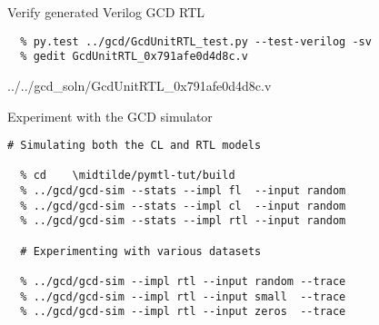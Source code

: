 \begin{task}\begin{frame}[fragile]{Verify generated Verilog GCD RTL}
\vspace{-0.25in}
\begin{Verbatim}[commandchars=\\\{\}]
  % cd    \midtilde/pymtl-tut/build
  % py.test ../gcd/GcdUnitRTL_test.py --test-verilog -sv
  % gedit GcdUnitRTL_0x791afe0d4d8c.v
\end{Verbatim}

\vspace{-0.3in}
%
{../../gcd_soln/GcdUnitRTL_0x791afe0d4d8c.v}
\end{frame}
\end{task}

\begin{task}\begin{frame}[fragile]{Experiment with the GCD simulator}
\vspace{-0.25in}
\begin{Verbatim}[commandchars=\\\{\}]
  # Simulating both the CL and RTL models

  % cd    \midtilde/pymtl-tut/build
  % ../gcd/gcd-sim --stats --impl fl  --input random
  % ../gcd/gcd-sim --stats --impl cl  --input random
  % ../gcd/gcd-sim --stats --impl rtl --input random

  # Experimenting with various datasets

  % ../gcd/gcd-sim --impl rtl --input random --trace
  % ../gcd/gcd-sim --impl rtl --input small  --trace
  % ../gcd/gcd-sim --impl rtl --input zeros  --trace

\end{Verbatim}
\end{frame}
\end{task}

